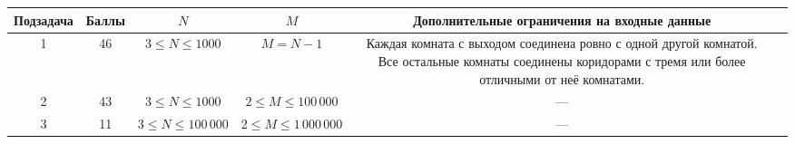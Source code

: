 \begin{center}
\renewcommand{\arraystretch}{1.5}
\begin{tabular}{|c|c|c|c|c|c|}
\hline
Подзадача & Баллы & $N$ & $M$ & \parbox{5cm}{\centering \vspace{2mm}Дополнительные ограничения на входные данные\\\vspace{2mm}}\\
 & 46 & $3 \le N \le 1 000$ & $M = N-1$ & \parbox{5cm}{\centering \vspace{2mm} Каждая комната с выходом соединена ровно с одной другой комнатой. Все остальные комнаты соединены коридорами с тремя или более отличными от неё комнатами.\\\vspace{2mm}}  \\
 & 43 & $3 \le N \le 1 000$ & $2 \le M \le 100\,000$ & --- \\
 & 11 & $3 \le N \le 100\,000$ & $2 \le M \le 1\,000\,000$ & --- \\
\hline
\end{tabular}
\end{center}
